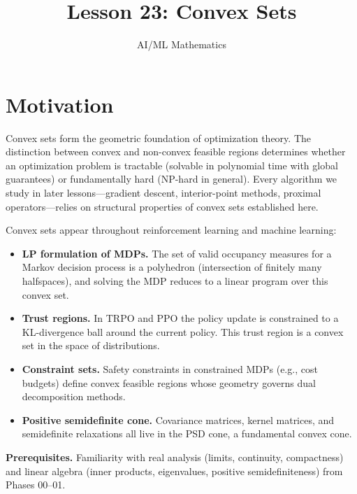 \documentclass[11pt,a4paper]{article}
\title{Lesson 23: Convex Sets}
\author{AI/ML Mathematics}
\date{}
\begin{document}
\maketitle
\tableofcontents
\newpage


\section{Motivation}

Convex sets form the geometric foundation of optimization theory.  The
distinction between convex and non-convex feasible regions determines whether an
optimization problem is tractable (solvable in polynomial time with global
guarantees) or fundamentally hard (NP-hard in general).  Every algorithm we
study in later lessons---gradient descent, interior-point methods, proximal
operators---relies on structural properties of convex sets established here.

\begin{rlconnection}
Convex sets appear throughout reinforcement learning and machine learning:
\begin{itemize}
  \item \textbf{LP formulation of MDPs.}  The set of valid occupancy measures
        for a Markov decision process is a polyhedron (intersection of finitely
        many halfspaces), and solving the MDP reduces to a linear program over
        this convex set.
  \item \textbf{Trust regions.}  In TRPO and PPO the policy update is
        constrained to a KL-divergence ball around the current policy.  This
        trust region is a convex set in the space of distributions.
  \item \textbf{Constraint sets.}  Safety constraints in constrained MDPs
        (e.g., cost budgets) define convex feasible regions whose geometry
        governs dual decomposition methods.
  \item \textbf{Positive semidefinite cone.}  Covariance matrices,
        kernel matrices, and semidefinite relaxations all live in the PSD cone,
        a fundamental convex cone.
\end{itemize}
\end{rlconnection}

\textbf{Prerequisites.}  Familiarity with real analysis (limits, continuity,
compactness) and linear algebra (inner products, eigenvalues, positive
semidefiniteness) from Phases 00--01.
\end{document}
